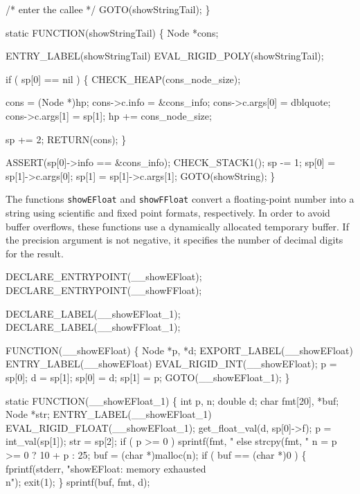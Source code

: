     /* enter the callee */
    GOTO(showStringTail);
\}

static
FUNCTION(showStringTail)
\{
    Node *cons;

 ENTRY_LABEL(showStringTail)
    EVAL_RIGID_POLY(showStringTail);

    if ( sp[0] == nil )
    \{
        CHECK_HEAP(cons_node_size);

        cons            = (Node *)hp;
        cons->c.info    = &cons_info;
        cons->c.args[0] = dblquote;
        cons->c.args[1] = sp[1];
        hp             += cons_node_size;

        sp += 2;
        RETURN(cons);
    \}

    ASSERT(sp[0]->info == &cons_info);
    CHECK_STACK1();
    sp   -= 1;
    sp[0] = sp[1]->c.args[0];
    sp[1] = sp[1]->c.args[1];
    GOTO(showString);
\}

\nwendcode{}\nwdocspar
The functions \verb|showEFloat| and \verb|showFFloat| convert a
floating-point number into a string using scientific and fixed
point formats, respectively. In order to avoid buffer overflows, these
functions use a dynamically allocated temporary buffer. If the
precision argument is not negative, it specifies the number of decimal
digits for the result.

\nwenddocs{}\plusendmoddef\nwstartdeflinemarkup{}\nwenddeflinemarkup
DECLARE_ENTRYPOINT(__showEFloat);
DECLARE_ENTRYPOINT(__showFFloat);

DECLARE_LABEL(__showEFloat_1);
DECLARE_LABEL(__showFFloat_1);

FUNCTION(__showEFloat)
\{
    Node *p, *d;
    EXPORT_LABEL(__showEFloat)
 ENTRY_LABEL(__showEFloat)
    EVAL_RIGID_INT(__showEFloat);
    p     = sp[0];
    d     = sp[1];
    sp[0] = d;
    sp[1] = p;
    GOTO(__showEFloat_1);
\}

static
FUNCTION(__showEFloat_1)
\{
    int    p, n;
    double d;
    char   fmt[20], *buf;
    Node   *str;
 ENTRY_LABEL(__showEFloat_1)
    EVAL_RIGID_FLOAT(__showEFloat_1);
    get_float_val(d, sp[0]->f);
    p   = int_val(sp[1]);
    str = sp[2];
    if ( p >= 0 )
        sprintf(fmt, "%
    else
        strcpy(fmt, "%
    n   = p >= 0 ? 10 + p : 25;
    buf = (char *)malloc(n);
    if ( buf == (char *)0 )
    \{
        fprintf(stderr, "showEFloat: memory exhausted\\n");
        exit(1);
    \}
    sprintf(buf, fmt, d);

